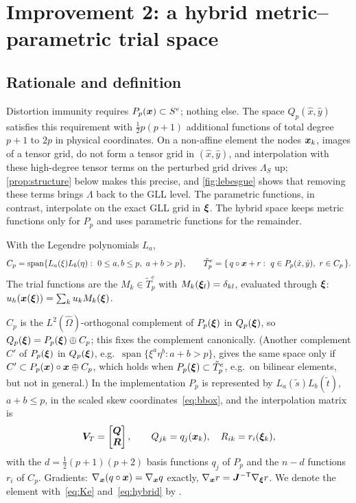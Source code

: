 \section{Improvement 2: a hybrid metric--parametric trial space}\label{sec:hybrid}
\subsection{Rationale and definition}
Distortion immunity requires $P_p(\bm{x})\subset S^e$; nothing else. The space $Q_p(\hat x,\hat
y)$ satisfies this requirement with $\tfrac12p(p+1)$ additional functions of total degree $p+1$
to $2p$ in physical coordinates. On a non-affine element the nodes $\bm{x}_k$, images of a tensor
grid, do not form a tensor grid in $(\hat x,\hat y)$, and interpolation with these high-degree
tensor terms on the perturbed grid drives $\Lambda_S$ up; \cref{prop:structure} below makes this
precise, and \cref{fig:lebesgue} shows that removing these terms brings $\Lambda$ back to the GLL
level. The
parametric functions, in contrast, interpolate on the exact GLL grid in $\bm{\xi}$. The hybrid
space keeps metric functions only for $P_p$ and uses parametric functions for the remainder.

\begin{definition}\label{def:hybrid}
With the Legendre polynomials $L_a$,
\begin{equation}
  C_p=\operatorname{span}\{L_a(\xi)L_b(\eta):\ 0\le a,b\le p,\ a+b>p\},\qquad
  \tilde T_p^e=\{\,q\circ\bm{x}+r:\ q\in P_p(\hat x,\hat y),\ r\in C_p\,\}.
  \label{eq:hybrid}
\end{equation}
The trial functions are the $M_k\in\tilde T_p^e$ with $M_k(\bm{\xi}_l)=\delta_{kl}$, evaluated
through $\bm{\xi}$: $u_h(\bm{x}(\bm{\xi}))=\sum_ku_kM_k(\bm{\xi})$.
\end{definition}
$C_p$ is the $L^2(\hat\Omega)$-orthogonal complement of $P_p(\bm{\xi})$ in $Q_p(\bm{\xi})$, so
$Q_p(\bm{\xi})=P_p(\bm{\xi})\oplus C_p$; this fixes the complement canonically. (Another complement
$C'$ of $P_p(\bm{\xi})$ in $Q_p(\bm{\xi})$, e.g.\ $\operatorname{span}\{\xi^a\eta^b:a+b>p\}$, gives the same
space only if $C'\subset P_p(\bm{x})\circ\bm{x}\oplus C_p$, which holds when $P_p(\bm{\xi})\subset\tilde
T_p^e$, e.g.\ on bilinear elements, but not in general.) In the
implementation $P_p$ is represented by $L_a(\tilde s)L_b(\tilde t)$, $a+b\le p$, in the scaled
skew coordinates~\eqref{eq:bbox}, and the interpolation matrix is
\begin{equation}
  \bm V_T=\begin{bmatrix}\bm Q\\ \bm R\end{bmatrix},\qquad
  Q_{jk}=q_j(\bm{x}_k),\quad R_{ik}=r_i(\bm{\xi}_k),
  \label{eq:VT}
\end{equation}
with the $d=\tfrac12(p+1)(p+2)$ basis functions $q_j$ of $P_p$ and the $n-d$ functions $r_i$
of $C_p$. Gradients: $\nabla_{\bm{x}}(q\circ\bm{x})=\nabla_{\bm{x}}q$ exactly, $\nabla_{\bm{x}}r=\bm
J^{-\mathsf{T}}\nabla_{\bm{\xi}}r$. We denote the element with~\eqref{eq:Ke} and~\eqref{eq:hybrid} by \PH.

